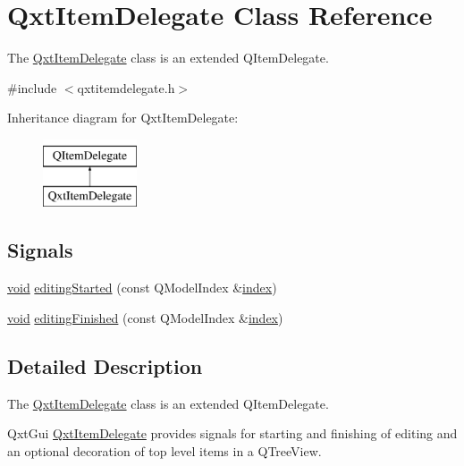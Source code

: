 \hypertarget{class_qxt_item_delegate}{\section{Qxt\-Item\-Delegate Class Reference}
\label{class_qxt_item_delegate}
}


The \hyperlink{class_qxt_item_delegate}{Qxt\-Item\-Delegate} class is an extended Q\-Item\-Delegate.  




{\ttfamily \#include $<$qxtitemdelegate.\-h$>$}

Inheritance diagram for Qxt\-Item\-Delegate\-:\begin{figure}[H]
\begin{center}
\leavevmode
\includegraphics[height=2.000000cm]{class_qxt_item_delegate}
\end{center}
\end{figure}
\subsection*{Signals}
\begin{DoxyCompactItemize}
\item 
\hyperlink{group___u_a_v_objects_plugin_ga444cf2ff3f0ecbe028adce838d373f5c}{void} \hyperlink{class_qxt_item_delegate_a3b3068865e5185d6eb4348c2dcce99d7}{editing\-Started} (const Q\-Model\-Index \&\hyperlink{glext_8h_ab47dd9958bcadea08866b42bf358e95e}{index})
\item 
\hyperlink{group___u_a_v_objects_plugin_ga444cf2ff3f0ecbe028adce838d373f5c}{void} \hyperlink{class_qxt_item_delegate_a593c068bb974266241f9a48c28200d26}{editing\-Finished} (const Q\-Model\-Index \&\hyperlink{glext_8h_ab47dd9958bcadea08866b42bf358e95e}{index})
\end{DoxyCompactItemize}


\subsection{Detailed Description}
The \hyperlink{class_qxt_item_delegate}{Qxt\-Item\-Delegate} class is an extended Q\-Item\-Delegate. 

Qxt\-Gui \hyperlink{class_qxt_item_delegate}{Qxt\-Item\-Delegate} provides signals for starting and finishing of editing and an optional decoration of top level items in a Q\-Tree\-View.

